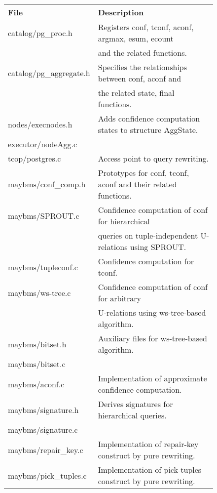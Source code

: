 \begin{figure}[ht]
\begin{center}
\small
\begin{tabular}{|l|l|}
\hline
File & Description \\
\hline
catalog/pg\_proc.h              & Registers conf, tconf, aconf, argmax, esum, ecount  \\
								& and the related functions. \\ \hline 
catalog/pg\_aggregate.h 		& Specifies the relationships between conf, aconf and  \\
                           		& the related state, final functions. \\ \hline
nodes/execnodes.h 				& Adds confidence computation states to structure AggState. \\ 
executor/nodeAgg.c      		&   \\ \hline
tcop/postgres.c        			& Access point to query rewriting. \\ \hline
maybms/conf\_comp.h           	& Prototypes for conf, tconf, aconf and their related functions.  \\ \hline 
maybms/SPROUT.c                     & Confidence computation of conf for hierarchical \\
                                & queries on tuple-independent U-relations using SPROUT. \\ \hline
maybms/tupleconf.c              & Confidence computation for tconf. \\ \hline
maybms/ws-tree.c            	& Confidence computation of conf for arbitrary \\
                            	& U-relations using ws-tree-based algorithm. \\ \hline
maybms/bitset.h                 & Auxiliary files for ws-tree-based algorithm. \\ 
maybms/bitset.c                 &  \\ \hline
maybms/aconf.c      			&    Implementation of approximate confidence computation. \\ \hline
maybms/signature.h   			& Derives signatures for hierarchical queries. \\  
maybms/signature.c      		&   \\ \hline
maybms/repair\_key.c       		& Implementation of repair-key construct by pure rewriting. \\ \hline 
maybms/pick\_tuples.c       		& Implementation of pick-tuples construct by pure rewriting. \\ \hline 

\end{tabular}
\end{center}
\end{figure}
